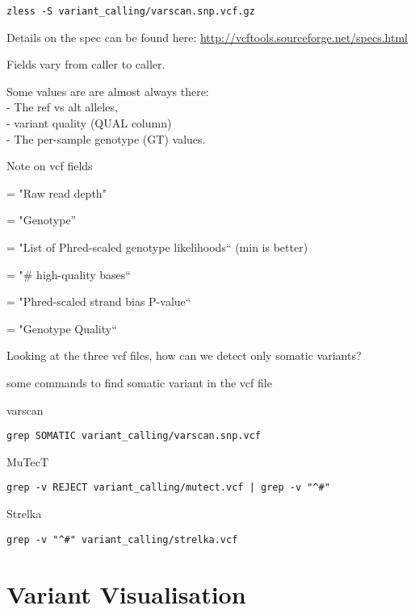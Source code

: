 \begin{lstlisting}
zless -S variant_calling/varscan.snp.vcf.gz
\end{lstlisting}

Details on the spec can be found here:
\url{http://vcftools.sourceforge.net/specs.html}

Fields vary from caller to caller.
 
Some values are are almost always there: \\
   - The ref vs alt alleles, \\
   - variant quality (QUAL column) \\
   - The per-sample genotype (GT) values.

Note on vcf fields
\begin{description}[style=multiline,labelindent=0cm,align=right,leftmargin=\descriptionlabelspace,rightmargin=1.5cm,font=\ttfamily]
	\item[DP] = "Raw read depth"
	\item[GT] = "Genotype” 
	\item[PL] = "List of Phred-scaled genotype likelihoods“ (min is better) 
	\item[DP] = "# high-quality bases“ 
	\item[SP] = "Phred-scaled strand bias P-value“  
	\item[GQ] = "Genotype Quality“
\end{description}

\begin{questions}
Looking at the three vcf files, how can we detect only somatic variants?
\end{questions}
\begin{answer}
some commands to find somatic variant in the vcf file

varscan
\begin{lstlisting}
grep SOMATIC variant_calling/varscan.snp.vcf 
\end{lstlisting}

MuTecT
\begin{lstlisting}
grep -v REJECT variant_calling/mutect.vcf | grep -v "^#"
\end{lstlisting}

Strelka
\begin{lstlisting}
grep -v "^#" variant_calling/strelka.vcf
\end{lstlisting}
\end{answer}


\newpage

\section{Variant Visualisation}

